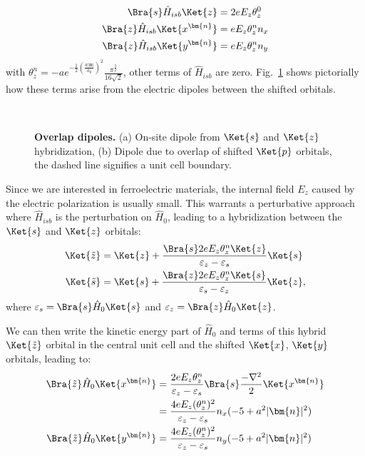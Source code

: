 \begin{align}
	\label{eq:dipole}
	\Bra{s} \hat{H}_{isb} \Ket{z} &= 2 e E_z \theta_z^0\\
	\Bra{z} \hat{H}_{isb} \Ket{x^{\bm{n}}} &= e E_z \theta_z^n n_x\\
	\Bra{z} \hat{H}_{isb} \Ket{y^{\bm{n}}} &= e E_z \theta_z^n n_y
\end{align}
with $\theta_z^n = -ae^{-\frac{1}{2}\left(\frac{a|\bm{n}|}{a_0}\right)^2}\frac{\pi^{\frac{3}{2}}}{16\sqrt{2}}$, other terms of $\hat{H}_{isb}$ are zero.
Fig.~\ref{fig:overlapdip} shows pictorially how these terms arise from the electric dipoles between the shifted orbitals. 
\begin{figure}[t]
~\centering
{}\caption{\label{fig:overlapdip} {\bf Overlap dipoles.} (a) On-site dipole from $\Ket{s}$ and $\Ket{z}$ hybridization, (b) Dipole due to overlap of shifted $\Ket{p}$ orbitals, the dashed line signifies a unit cell boundary.}
\end{figure}
Since we are interested in ferroelectric materials, the internal field $E_z$ caused by the electric polarization is usually small.
This warrants a perturbative approach where $\hat{H}_{isb}$ is the perturbation on $\hat{H}_0$, leading to a hybridization between the $\Ket{s}$ and $\Ket{z}$ orbitals:
\begin{align}
	\Ket{\tilde{z}} &= \Ket{z} + \frac{\Bra{s} 2 e E_z \theta^n_z\Ket{z}}{\varepsilon_z - \varepsilon_s}\Ket{s}\\
	\Ket{\tilde{s}}   &= \Ket{s} + \frac{\Bra{z} 2 e E_z \theta^n_z\Ket{s}}{\varepsilon_s - \varepsilon_z}\Ket{z},
\end{align}
where $\varepsilon_s = \Bra{s} \hat{H}_0 \Ket{s}$ and $\varepsilon_z = \Bra{z} \hat{H}_0 \Ket{z}$.

We can then write the kinetic energy part of $\hat{H}_0$ and terms of this hybrid $\Ket{\tilde{z}}$ orbital in the central unit cell and the shifted $\Ket{x}$, $\Ket{y}$ orbitals, leading to:
\begin{align}
	\Bra{\tilde{z}} \hat{H}_0 \Ket{x^{\bm{n}}} &= \frac{2 e E_z \theta_z^n}{\varepsilon_z - \varepsilon_s}\Bra{s} \frac{-\mathbf{\nabla}^2}{2} \Ket{x^{\bm{n}}}\\
	&= \frac{4 e E_z (\theta_z^n)^2}{\varepsilon_z - \varepsilon_s} n_x (-5 + a^2 |\bm{n}|^2)\\
	\Bra{\tilde{z}} \hat{H}_0 \Ket{y^{\bm{n}}} &= \frac{4 e E_z (\theta_z^n)^2}{\varepsilon_z - \varepsilon_s} n_y (-5 + a^2 |\bm{n}|^2)
\end{align}

